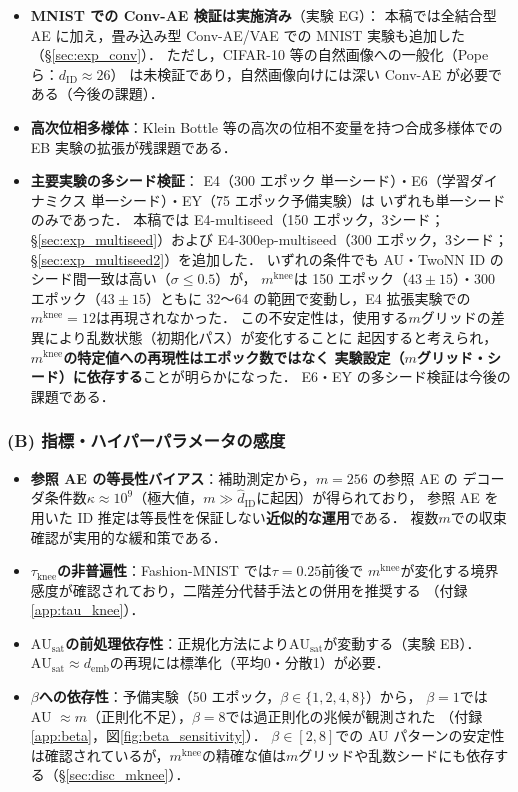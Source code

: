 \documentclass[11pt,a4paper]{jsarticle}
\newcommand{\kap}{\kappa}
\newcommand{\AUsat}{\mathrm{AU}_{\mathrm{sat}}}
\newcommand{\mknee}{m^{\mathrm{knee}}}
\newcommand{\demb}{d_{\mathrm{emb}}}
\begin{document}
\begin{itemize}
  \item \textbf{MNIST での Conv-AE 検証は実施済み}（実験 EG）：
        本稿では全結合型 AE に加え，畳み込み型 Conv-AE/VAE での MNIST 実験も追加した（§\ref{sec:exp_conv}）．
        ただし，CIFAR-10 等の自然画像への一般化（Pope ら\cite{pope2021intrinsic}：$d_\mathrm{ID} \approx 26$）
        は未検証であり，自然画像向けには深い Conv-AE が必要である（今後の課題）．
  \item \textbf{高次位相多様体}：Klein Bottle 等の高次の位相不変量を持つ合成多様体での
        EB 実験の拡張が残課題である．
  \item \textbf{主要実験の多シード検証}：
        E4（300 エポック 単一シード）・E6（学習ダイナミクス 単一シード）・EY（75 エポック予備実験）は
        いずれも単一シードのみであった．
        本稿では E4-multiseed（150 エポック，3シード；§\ref{sec:exp_multiseed}）および
        E4-300ep-multiseed（300 エポック，3シード；§\ref{sec:exp_multiseed2}）を追加した．
        いずれの条件でも AU・TwoNN ID のシード間一致は高い（$\sigma \leq 0.5$）が，
        $\mknee$は 150 エポック（$43 \pm 15$）・300 エポック（$43 \pm 15$）ともに
        32〜64 の範囲で変動し，E4 拡張実験での$\mknee = 12$は再現されなかった．
        この不安定性は，使用する$m$グリッドの差異により乱数状態（初期化パス）が変化することに
        起因すると考えられ，\textbf{$\mknee$の特定値への再現性はエポック数ではなく
        実験設定（$m$グリッド・シード）に依存する}ことが明らかになった．
        E6・EY の多シード検証は今後の課題である．
\end{itemize}

\subsubsection*{(B) 指標・ハイパーパラメータの感度}

\begin{itemize}
  \item \textbf{参照 AE の等長性バイアス}：補助測定から，$m = 256$ の参照 AE の
        デコーダ条件数$\kap \approx 10^9$（極大値，$m \gg \hat{d}_\mathrm{ID}$に起因）が得られており，
        参照 AE を用いた ID 推定は等長性を保証しない\textbf{近似的な運用}である．
        複数$m$での収束確認が実用的な緩和策である．
  \item \textbf{$\tau_{\mathrm{knee}}$の非普遍性}：Fashion-MNIST では$\tau = 0.25$前後で
        $\mknee$が変化する境界感度が確認されており，二階差分代替手法との併用を推奨する
        （付録\ref{app:tau_knee}）．
  \item \textbf{$\AUsat$の前処理依存性}：正規化方法により$\AUsat$が変動する（実験 EB）．
        $\AUsat \approx \demb$の再現には標準化（平均0・分散1）が必要．
  \item \textbf{$\beta$への依存性}：予備実験（50 エポック，$\beta \in \{1,2,4,8\}$）から，
        $\beta = 1$では AU $\approx m$（正則化不足），$\beta = 8$では過正則化の兆候が観測された
        （付録\ref{app:beta}，図\ref{fig:beta_sensitivity}）．
        $\beta \in [2, 8]$での AU パターンの安定性は確認されているが，$\mknee$の精確な値は$m$グリッドや乱数シードにも依存する（§\ref{sec:disc_mknee}）．
\end{itemize}
\end{document}
